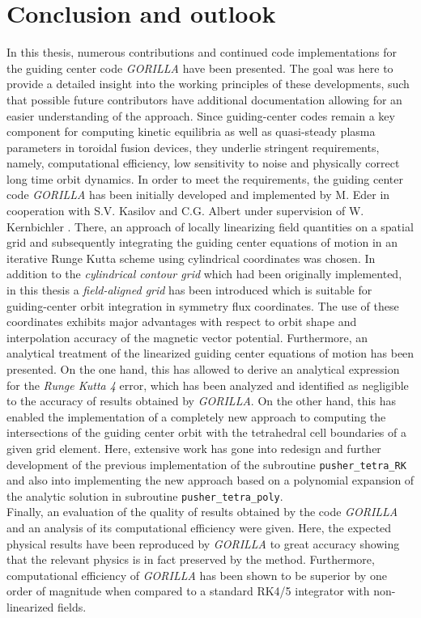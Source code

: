 \documentclass[./main.tex]{subfiles}
\begin{document}
\chapter{Conclusion and outlook}
In this thesis, numerous contributions and continued code implementations for the guiding center code \textit{GORILLA} have been presented. The goal was here to provide a detailed insight into the working principles of these developments, such that possible future contributors have additional documentation allowing for an easier understanding of the approach. Since guiding-center codes remain a key component for computing kinetic equilibria as well as quasi-steady plasma parameters in toroidal fusion devices, they underlie stringent requirements, namely, computational efficiency, low sensitivity to noise and physically correct long time orbit dynamics. In order to meet the requirements, the guiding center code \textit{GORILLA} has been initially developed and implemented by M. Eder in cooperation with S.V. Kasilov and C.G. Albert under supervision of W. Kernbichler \cite{Eder_DA}. There, an approach of locally linearizing field quantities on a spatial grid and subsequently integrating the guiding center equations of motion in an iterative Runge Kutta scheme using cylindrical coordinates was chosen. In addition to the \textit{cylindrical contour grid} which had been originally implemented, in this thesis a \textit{field-aligned grid} has been introduced which is suitable for guiding-center orbit integration in symmetry flux coordinates. The use of these coordinates exhibits major advantages with respect to orbit shape and interpolation accuracy of the magnetic vector potential. 
Furthermore, an analytical treatment of the linearized guiding center equations of motion has been presented. On the one hand, this has allowed to derive an analytical expression for the \textit{Runge Kutta 4} error, which has been analyzed and identified as negligible to the accuracy of results obtained by \textit{GORILLA}. On the other hand, this has enabled the implementation of a completely new approach to computing the intersections of the guiding center orbit with the tetrahedral cell boundaries of a given grid element. Here, extensive work has gone into redesign and further development of the previous implementation of the subroutine \texttt{pusher\_tetra\_RK} and also into implementing the new approach based on a polynomial expansion of the analytic solution in subroutine \texttt{pusher\_tetra\_poly}. \\
Finally, an evaluation of the quality of results obtained by the code \textit{GORILLA} and an analysis of its computational efficiency were given. Here, the expected physical results have been reproduced by \textit{GORILLA} to great accuracy showing that the relevant physics is in fact preserved by the method. Furthermore, computational efficiency of \textit{GORILLA} has been shown to be superior by one order of magnitude when compared to a standard RK4/5 integrator with non-linearized fields.
\end{document}
